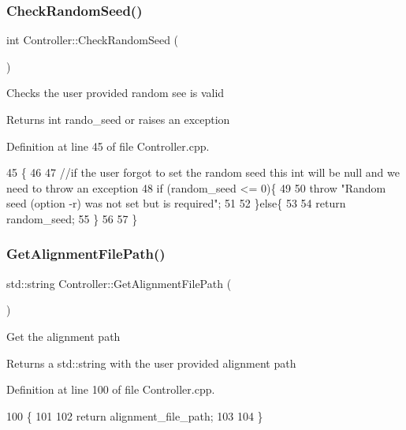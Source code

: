 \subsubsection{\texorpdfstring{Check\+Random\+Seed()}{CheckRandomSeed()}}
{\footnotesize\ttfamily int Controller\+::\+Check\+Random\+Seed (\begin{DoxyParamCaption}{ }\end{DoxyParamCaption})}

Checks the user provided random see is valid \begin{DoxyReturn}{Returns}
int rando\+\_\+seed or raises an exception 
\end{DoxyReturn}


Definition at line 45 of file Controller.\+cpp.


\begin{DoxyCode}
45                                 \{
46   
47   \textcolor{comment}{//if the user forgot to set the random seed this int will be null and we need to throw an exception}
48   \textcolor{keywordflow}{if} (random\_seed <= 0)\{
49     
50     \textcolor{keywordflow}{throw} \textcolor{stringliteral}{"Random seed (option -r) was not set but is required"};
51     
52   \}\textcolor{keywordflow}{else}\{
53   
54     \textcolor{keywordflow}{return} random\_seed;
55   \}
56   
57 \}
\end{DoxyCode}
\mbox{\label{classController_a5a9cf95b7410c4ca65036b8204856cd0}} 
\subsubsection{\texorpdfstring{Get\+Alignment\+File\+Path()}{GetAlignmentFilePath()}}
{\footnotesize\ttfamily std\+::string Controller\+::\+Get\+Alignment\+File\+Path (\begin{DoxyParamCaption}{ }\end{DoxyParamCaption})}

Get the alignment path \begin{DoxyReturn}{Returns}
a std\+::string with the user provided alignment path 
\end{DoxyReturn}


Definition at line 100 of file Controller.\+cpp.


\begin{DoxyCode}
100                                            \{
101   
102     \textcolor{keywordflow}{return} alignment\_file\_path;
103   
104 \}
\end{DoxyCode}
\mbox{\label{classController_aa645cd80a92c70d1cbffbc4e97ce27ae}} 
